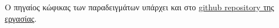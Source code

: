 \newpage
Ο πηγαίος κώφικας των παραδειγμάτων υπάρχει και στο \href{https://github.com/angpapan/Csharp_demo_code}{github repository της εργασίας}. 